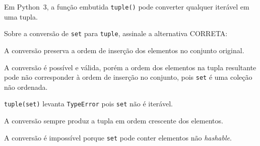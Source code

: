 
{%
\item \rtask \ponto{\pt}%
Em Python~3, a função embutida \lstinline[style=Python]|tuple()|
pode converter qualquer iterável em uma tupla. 

Sobre a conversão
de \lstinline[style=Python]|set| para \lstinline[style=Python]|tuple|,
assinale a alternativa CORRETA:

\begin{answerlist}[label={\texttt{\Alph*}.},leftmargin=*]
    \ti A conversão preserva a ordem de inserção dos
        elementos no conjunto original.

    \di A conversão é possível e válida, porém a
        {ordem dos elementos} na tupla resultante
        pode não corresponder à ordem de inserção no
        conjunto, pois \lstinline[style=Python]|set| é uma
        coleção não ordenada.

    \ti \lstinline[style=Python]|tuple(set)| levanta
        \lstinline[style=Python]|TypeError| pois
        \lstinline[style=Python]|set| não é iterável.

    \ti A conversão sempre produz a tupla em ordem crescente
        dos elementos.

    \ti A conversão é impossível porque \lstinline[style=Python]|set|
        pode conter elementos não \textit{hashable}.
\end{answerlist}
}
